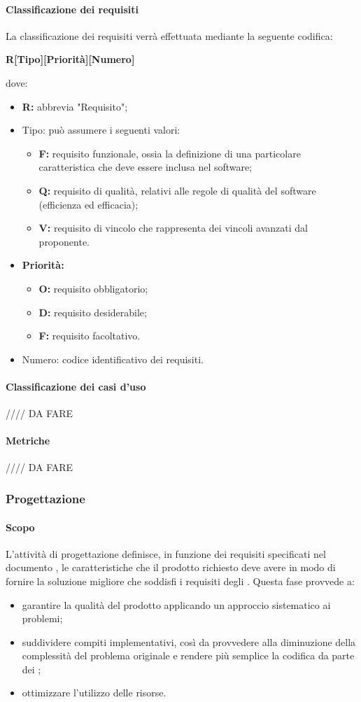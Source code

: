 \paragraph{Classificazione dei requisiti}
La classificazione dei requisiti verrà effettuata mediante la seguente codifica:\newline
\centerline{\textbf{R[Tipo][Priorità][Numero]}}\newline
dove:
\begin{itemize}
	\item \textbf{R:} abbrevia "Requisito";
	\item Tipo: può assumere i seguenti valori:
	\begin{itemize}
		\item \textbf{F:} requisito funzionale, ossia la definizione di una particolare caratteristica che deve essere inclusa nel software;
		\item \textbf{Q:} requisito di qualità, relativi alle regole di qualità del software (efficienza ed efficacia);
		\item \textbf{V:} requisito di vincolo che rappresenta dei vincoli avanzati dal proponente.
	\end{itemize}
	\item \textbf{Priorità:}
	\begin{itemize}
		\item \textbf{O:} requisito obbligatorio;
		\item \textbf{D:} requisito desiderabile;
		\item \textbf{F:} requisito facoltativo.
	\end{itemize}
	\item Numero: codice identificativo dei requisiti.
\end{itemize}
\paragraph{Classificazione dei casi d'uso}
//// DA FARE
\paragraph{Metriche}
//// DA FARE
\subsubsection{Progettazione}
\paragraph{Scopo}
L'attività di progettazione definisce, in funzione dei requisiti specificati nel documento \AdR{}, le caratteristiche che il prodotto richiesto deve avere in modo di fornire la soluzione migliore che soddisfi i requisiti degli .  Questa fase provvede a:
\begin{itemize}
\item garantire la qualità del prodotto applicando un approccio sistematico ai problemi;
\item suddividere compiti implementativi,  così da provvedere alla diminuzione della complessità del problema originale e rendere più semplice la codifica da parte dei \progrs{};
\item ottimizzare l'utilizzo delle risorse.
\end{itemize}
